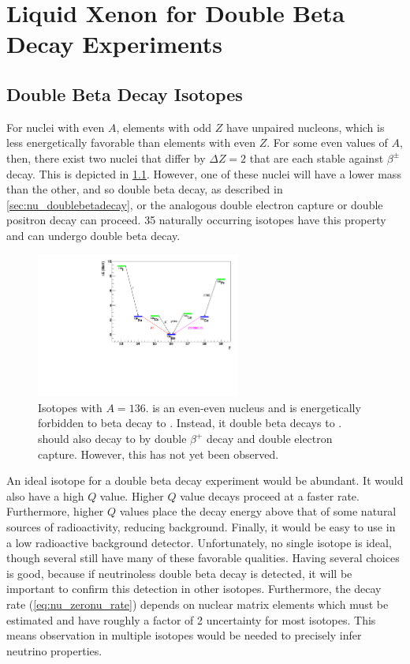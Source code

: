 \documentclass[herrin-thesis.tex]{subfiles}
\begin{document}
\chapter[LXe for \(\beta\beta\) decay experiments]{Liquid Xenon for Double Beta Decay Experiments}
\label{ch:liquidxe}

\section{Double Beta Decay Isotopes}
For nuclei with even \(A\), elements with odd \(Z\) have unpaired nucleons, which is less energetically favorable than elements with even \(Z\). For some even values of \(A\), then, there exist two nuclei that differ by \(\Delta Z = 2\) that are each stable against \(\beta^{\pm}\) decay. This is depicted in \cref{fig:xe_nuclei_masses}. However, one of these nuclei will have a lower mass than the other, and so double beta decay, as described in \cref{sec:nu_doublebetadecay}, or the analogous double electron capture or double positron decay can proceed. 35 naturally occurring isotopes have this property and can undergo double beta decay.

\begin{figure}[htp]
\centering
\includegraphics[width=0.6\textwidth]{./plots/xe_nuclei_masses.pdf}
\caption[Nuclear decay structure for \(A=136\)]{Isotopes with \(A=136\).  is an even-even nucleus and is energetically forbidden to beta decay to . Instead, it double beta decays to .  should also decay to  by double \(\beta^{+}\) decay and double electron capture. However, this has not yet been observed.}
\label{fig:xe_nuclei_masses}
\end{figure}

An ideal isotope for a double beta decay experiment would be abundant. It would also have a high \(Q\) value. Higher \(Q\) value decays proceed at a faster rate. Furthermore, higher \(Q\) values place the decay energy above that of some natural sources of radioactivity, reducing background. Finally, it would be easy to use in a low radioactive background detector. Unfortunately, no single isotope is ideal, though several still have many of these favorable qualities. Having several choices is good, because if neutrinoless double beta decay is detected, it will be important to confirm this detection in other isotopes. Furthermore, the decay rate (\cref{eq:nu_zeronu_rate}) depends on nuclear matrix elements which must be estimated and have roughly a factor of 2 uncertainty for most isotopes. This means observation in multiple isotopes would be needed to precisely infer neutrino properties.
\end{document}
